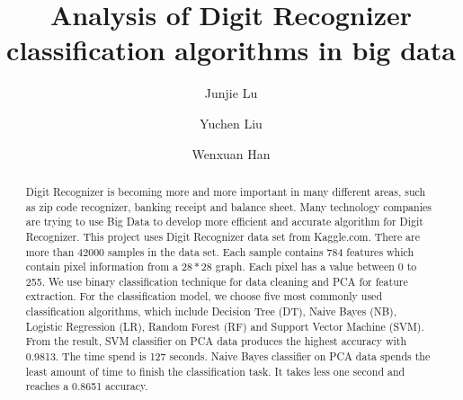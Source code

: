 \documentclass[sigconf]{acmart}
\begin{document}
\title{Analysis of Digit Recognizer classification algorithms in big data}


\author{Junjie Lu}


\author{Yuchen Liu}

\author{Wenxuan Han}


\makeatletter
\def\subsubsection{\@startsection{subsubsection}{3}%
  \z@{.5\linespacing\@plus.7\linespacing}{.1\linespacing}%
  {\normalfont\itshape}}
\makeatother

\begin{abstract}

Digit Recognizer is becoming more and more important in many different areas, such as zip code recognizer, banking receipt and balance sheet. Many technology companies are trying to use Big Data to develop more efficient and accurate algorithm for Digit Recognizer. This project uses Digit Recognizer data set from Kaggle.com. There are more than 42000 samples in the data set. Each sample contains 784 features which contain pixel information from a $28*28$ graph. Each pixel has a value between 0 to 255. We use binary classification technique for data cleaning and PCA for feature extraction. For the classification model, we choose five most commonly used classification algorithms, which include Decision Tree (DT), Naive Bayes (NB), Logistic Regression (LR), Random Forest (RF) and Support Vector Machine (SVM). From the result, SVM classifier on PCA data produces the highest accuracy with 0.9813. The time spend is 127 seconds. Naive Bayes classifier on PCA data spends the least amount of time to finish the classification task. It takes less one second and reaches a 0.8651 accuracy.

\end{abstract}
\end{document}
